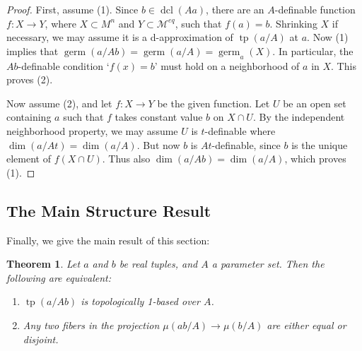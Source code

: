 \documentclass{amsart}
\newtheorem{theorem}{Theorem}[section]
\theoremstyle{definition}
\newcommand{\dcl}{\operatorname{dcl}}
\newcommand{\tp}{\operatorname{tp}}
\begin{document}
\begin{proof}
    First, assume (1). Since $b\in\dcl(Aa)$, there are an $A$-definable function $f:X\rightarrow Y$, where $X\subset M^n$ and $Y\subset\mathcal M^{eq}$, such that $f(a)=b$. Shrinking $X$ if necessary, we may assume it is a d-approximation of $\tp(a/A)$ at $a$. Now (1) implies that $\operatorname{germ}(a/Ab)=\operatorname{germ}(a/A)=\operatorname{germ}_a(X)$. In particular, the $Ab$-definable condition `$f(x)=b$' must hold on a neighborhood of $a$ in $X$. This proves (2).

    Now assume (2), and let $f:X\rightarrow Y$ be the given function. Let $U$ be an open set containing $a$ such that $f$ takes constant value $b$ on $X\cap U$. By the independent neighborhood property, we may assume $U$ is $t$-definable where $\dim(a/At)=\dim(a/A)$. But now $b$ is $At$-definable, since $b$ is the unique element of $f(X\cap U)$. Thus also $\dim(a/Ab)=\dim(a/A)$, which proves (1).
\end{proof}

\subsection{The Main Structure Result}

Finally, we give the main result of this section:

\begin{theorem}\label{T: partition} Let $a$ and $b$ be real tuples, and $A$ a parameter set. Then the following are equivalent: 
\begin{enumerate}
    \item $\tp(a/Ab)$ is topologically 1-based over $A$.
    \item Any two fibers in the projection $\mu(ab/A)\rightarrow\mu(b/A)$ are either equal or disjoint. 
\end{enumerate}
\end{theorem}
\end{document}
